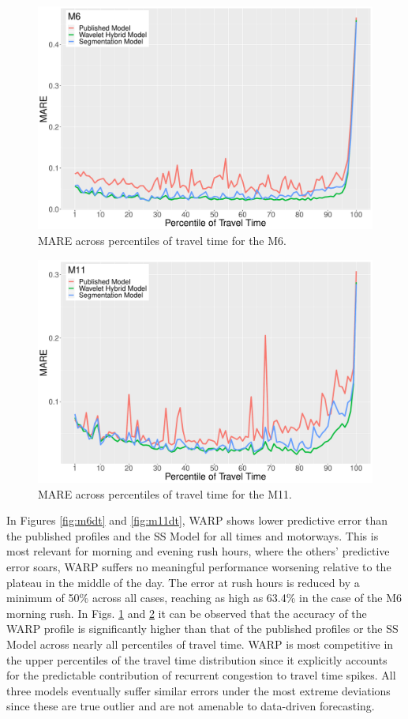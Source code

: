 \documentclass[a4paper, 10pt, conference]{ieeeconf}      %
\begin{document}
\begin{figure}[htbp]
	\centerline{\includegraphics[width=\linewidth]{./images/M6_quantile_1_ab_8_12.pdf}}
	\caption{MARE across percentiles of travel time for the M6.}
	\label{fig:m6q}
\end{figure}
\begin{figure}[htbp]
	\centerline{\includegraphics[width=\linewidth]{./images/M11_quantile_1_ab_8_12.pdf}}
	\caption{MARE across percentiles of travel time for the M11.}
	\label{fig:m11q}
\end{figure}

In Figures \ref{fig:m6dt} and \ref{fig:m11dt}, WARP shows lower predictive error than the published profiles and the SS Model for all times and motorways. 
This is most relevant for morning and evening rush hours, where the others' predictive error soars, WARP suffers no meaningful performance worsening relative to the plateau in the middle of the day.
The error at rush hours is reduced by a minimum of 50\% across all cases, reaching as high as 63.4\% in the case of the M6 morning rush.
In Figs. \ref{fig:m6q} and \ref{fig:m11q} it can be observed that the accuracy of the WARP profile is significantly higher than that of the published profiles or the SS Model across nearly all percentiles of travel time.
WARP is most competitive in the upper percentiles of the travel time distribution since it explicitly accounts for the predictable contribution of recurrent congestion to travel time spikes. 
All three models eventually suffer similar errors under the most extreme deviations since these are true outlier and are not amenable to data-driven forecasting.
\end{document}
